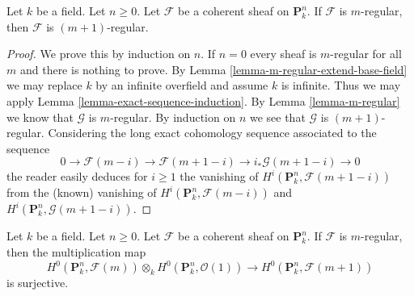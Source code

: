 \begin{lemma}
\label{lemma-m-regular-up}
Let $k$ be a field. Let $n \geq 0$.
Let $\mathcal{F}$ be a coherent sheaf on $\mathbf{P}^n_k$.
If $\mathcal{F}$ is $m$-regular, then $\mathcal{F}$ is
$(m + 1)$-regular.
\end{lemma}

\begin{proof}
We prove this by induction on $n$. If $n = 0$ every sheaf is $m$-regular
for all $m$ and there is nothing to prove. By
Lemma \ref{lemma-m-regular-extend-base-field} we may replace $k$
by an infinite overfield and assume $k$ is infinite.
Thus we may apply Lemma \ref{lemma-exact-sequence-induction}.
By Lemma \ref{lemma-m-regular} we know that $\mathcal{G}$ is
$m$-regular. By induction on $n$ we see that $\mathcal{G}$ is
$(m + 1)$-regular. Considering the long exact cohomology sequence
associated to the sequence
$$
0 \to \mathcal{F}(m - i) \to \mathcal{F}(m + 1 - i)
\to i_*\mathcal{G}(m + 1 - i) \to 0
$$
the reader easily deduces for $i \geq 1$ the vanishing of
$H^i(\mathbf{P}^n_k, \mathcal{F}(m + 1 - i))$ from the (known) vanishing of
$H^i(\mathbf{P}^n_k, \mathcal{F}(m - i))$ and
$H^i(\mathbf{P}^n_k, \mathcal{G}(m + 1 - i))$.
\end{proof}

\begin{lemma}
\label{lemma-m-regular-multiply}
Let $k$ be a field. Let $n \geq 0$.
Let $\mathcal{F}$ be a coherent sheaf on $\mathbf{P}^n_k$.
If $\mathcal{F}$ is $m$-regular, then the multiplication map
$$
H^0(\mathbf{P}^n_k, \mathcal{F}(m)) \otimes_k
H^0(\mathbf{P}^n_k, \mathcal{O}(1))
\longrightarrow
H^0(\mathbf{P}^n_k, \mathcal{F}(m + 1))
$$
is surjective.
\end{lemma}

